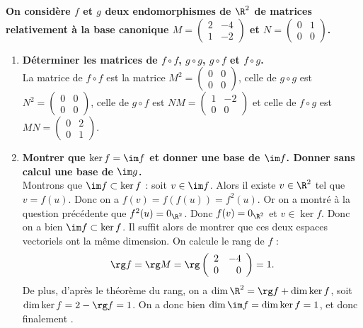 \documentclass[a4paper, 11pt,reqno]{article}
\begin{document}
\begin{correction}  \;
	\textbf{On consid\`ere $f$ et $g$ deux endomorphismes de $\R^2$ de matrices relativement \`a la base canonique $M=\left(\begin{array}{ll} 2&-4\\1&-2 \end{array}\right)$ et
		$N=\left(\begin{array}{ll} 0&1\\0&0 \end{array}\right)$.}
	\begin{enumerate}
		\item \textbf{D\'eterminer les matrices de $f\circ f$, $g\circ g$, $g\circ f$ et $f\circ g$.}\\
		      La matrice de $f\circ f$ est la matrice $M^2=\left(\begin{array}{ll} 0&0\\0&0 \end{array}\right)$, celle de $g\circ g$ est $N^2=\left(\begin{array}{rr} 0&0\\0&0 \end{array}\right)$, celle de $g\circ f$ est $NM = \left(\begin{array}{rr} 1&-2\\0&0 \end{array}\right)$ et celle de $f \circ g$ est $MN = \left(\begin{array}{ll} 0&2\\0&1 \end{array}\right)$.
		\item \textbf{Montrer que $\ker f=\im f$ et donner une base de $\im f$. Donner sans calcul une base de $\im g$.}\\
		      Montrons que  $\im f \subset \ker f$ : soit $v \in \im f$. Alors il existe $v \in \R^2$ tel que $v =f(u)$. Donc on a $f(v) = f(f(u)) = f^2(u)$. Or on a montr\'e \`a la question pr\'ec\'edente que $f^2(u) = 0_{\R^2}$. Donc $f(v) = 0_{\R^2}$ et $v \in \ker f$. Donc on a bien $\im f \subset \ker f$. Il suffit alors de montrer que ces deux espaces vectoriels ont la m\^eme dimension. On calcule le rang de $f$ :
		      $$\rg f = \rg M =  \rg \left(\begin{array}{rr} 2&-4\\0&0 \end{array}\right) = 1.$$
		      De plus, d'apr\`es le th\'eor\`eme du rang, on a $\dim \R^2 = \rg f + \dim \ker f$, soit $\dim \ker f = 2- \rg f = 1$. On a donc bien $\dim \im f = \dim \ker f = 1$, et donc finalement .\\

\end{enumerate}
\end{correction}
\end{document}
